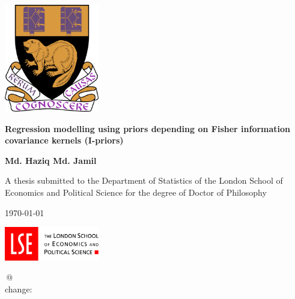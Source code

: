 \documentclass[11pt,twoside,openright,showframe]{report}
\begin{document}
\begin{titlepage}
  \singlespacing
  \begin{center}
    
    \vspace*{6.25mm}
     
    \includegraphics[width=0.31\textwidth]{figure/lse_coat_of_arms_1024}
    \vspace{15.2mm}
    
    \LARGE
    {\textbf{Regression modelling using priors depending on Fisher information covariance kernels (I-priors)}}
    \vspace{12.16mm}  %
    
    \Large 
    \textbf{Md. Haziq Md. Jamil}
    \vfill
    
    \normalsize
    A thesis submitted to the Department of Statistics of the London School of Economics and Political Science for the degree of Doctor of Philosophy
    \vspace{1cm}
    
    \UKvardate
    \today
    \vspace{1cm}
    
    \includegraphics[width=0.31\textwidth]{figure/lse_logo_1024}
  
  \end{center}
\end{titlepage}

\begin{center}
  \vspace*{1cm}
  
  \vfill
  
  \begingroup
    \singlespacing
    \color{grymath}
    \ttfamily 
    [git]\;\gitBranch\,@\,\gitAbbrevHash{} \\[-0.3em]
    change:\;\gitAuthorIsoDate
  \endgroup
\end{center}
\end{document}

